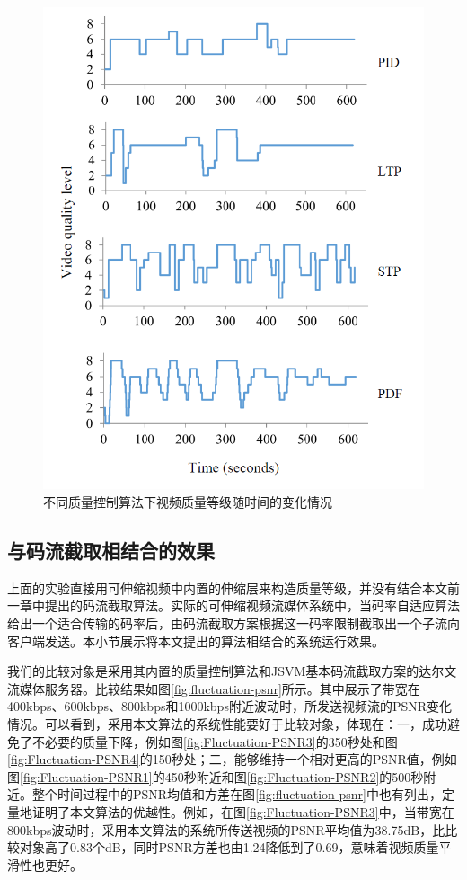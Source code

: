 \begin{figure}
\centering
\includegraphics[width = 0.45\linewidth]{figures/Fluctuation.png}
\caption{不同质量控制算法下视频质量等级随时间的变化情况 \label{fig:fluctuation}}
\end{figure}

\subsection{与码流截取相结合的效果}

上面的实验直接用可伸缩视频中内置的伸缩层来构造质量等级，并没有结合本文前一章中提出的码流截取算法。实际的可伸缩视频流媒体系统中，当码率自适应算法给出一个适合传输的码率后，由码流截取方案根据这一码率限制截取出一个子流向客户端发送。本小节展示将本文提出的算法相结合的系统运行效果。

我们的比较对象是采用其内置的质量控制算法和JSVM基本码流截取方案的达尔文流媒体服务器。比较结果如图\ref{fig:fluctuation-psnr}所示。其中展示了带宽在400kbps、600kbps、800kbps和1000kbps附近波动时，所发送视频流的PSNR变化情况。可以看到，采用本文算法的系统性能要好于比较对象，体现在：一，成功避免了不必要的质量下降，例如图\ref{fig:Fluctuation-PSNR3}的350秒处和图\ref{fig:Fluctuation-PSNR4}的150秒处；二，能够维持一个相对更高的PSNR值，例如图\ref{fig:Fluctuation-PSNR1}的450秒附近和图\ref{fig:Fluctuation-PSNR2}的500秒附近。整个时间过程中的PSNR均值和方差在图\ref{fig:fluctuation-psnr}中也有列出，定量地证明了本文算法的优越性。例如，在图\ref{fig:Fluctuation-PSNR3}中，当带宽在800kbps波动时，采用本文算法的系统所传送视频的PSNR平均值为38.75dB，比比较对象高了0.83个dB，同时PSNR方差也由1.24降低到了0.69，意味着视频质量平滑性也更好。


